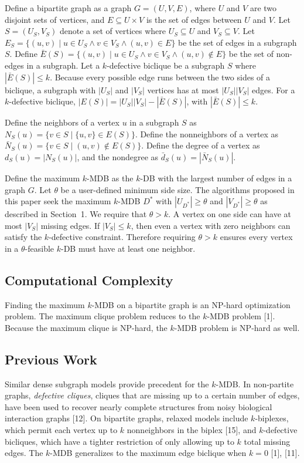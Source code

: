 \documentclass[conference]{IEEEtran}
\begin{document}
Define a bipartite graph as a graph $G = (U, V, E)$, where $U$ and $V$ are two disjoint sets of vertices, and $E \subseteq U \times V$ is the set of edges between $U$ and $V$. Let $S = (U_S, V_S)$ denote a set of vertices where $U_S \subseteq U$ and $V_S \subseteq V$. Let $E_S = \{(u, v) \mid u \in U_S \wedge v \in V_S \wedge (u, v) \in E \}$ be the set of edges in a subgraph $S$. Define $\bar{E}(S) = \{(u, v) \mid u \in U_S \wedge v \in V_S \wedge (u, v) \not\in E \}$ be the set of non-edges in a subgraph. Let a $k$-defective biclique be a subgraph $S$ where $|\bar{E}(S)| \leq k$. Because every possible edge runs between the two sides of a biclique, a subgraph with $|U_S|$ and $|V_S|$ vertices has at most $|U_S||V_S|$ edges. For a $k$-defective biclique, $|E(S)|=|U_S||V_S|-|\bar E(S)|$, with $|\bar E(S)|\le k$.


Define the neighbors of a vertex $u$ in a subgraph $S$ as $N_S(u) = \{v \in S \mid \{u, v\} \in E(S)\}$. Define the nonneighbors of a vertex as $\bar{N}_S(u) = \{v \in S \mid (u, v) \not\in E(S)\}$. Define the degree of a vertex as $d_S(u) = |N_S(u)|$, and the nondegree as $\bar{d}_S(u) = |\bar{N}_S(u)|$.


Define the maximum $k$-MDB as the $k$-DB with the largest number of edges in a graph $G$. Let $\theta$ be a user-defined minimum side size. The algorithms proposed in this paper seek the maximum $k$-MDB $D^*$ with $|U_{D^*}| \geq \theta$ and $|V_{D^*}| \geq \theta$ as described in Section~1. We require that $\theta > k$. A vertex on one side can have at most $|V_S|$ missing edges. If $|V_S| \le k$, then even a vertex with zero neighbors can satisfy the $k$-defective constraint. Therefore requiring $\theta>k$ ensures every vertex in a $\theta$-feasible $k$-DB must have at least one neighbor.


\subsection{Computational Complexity}


Finding the maximum $k$-MDB on a bipartite graph is an NP-hard optimization problem. The maximum clique problem reduces to the $k$-MDB problem [1]. Because the maximum clique is NP-hard, the $k$-MDB problem is NP-hard as well.


\subsection{Previous Work}


Similar dense subgraph models provide precedent for the $k$-MDB. In non-partite graphs, \emph{defective cliques}, cliques that are missing up to a certain number of edges, have been used to recover nearly complete structures from noisy biological interaction graphs [12]. On bipartite graphs, relaxed models include $k$-biplexes, which permit each vertex up to $k$ nonneighbors in the biplex [15], and $k$-defective bicliques, which have a tighter restriction of only allowing up to $k$ total missing edges. The $k$-MDB generalizes to the maximum edge biclique when $k = 0$ [1], [11].
\end{document}
